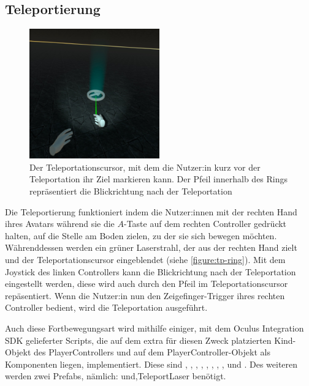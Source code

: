 \subsection{Teleportierung}\label{subsec:teleport-implementation}
\begin{figure}[!h]
    \centering
    \includegraphics[width=0.5\textwidth]{vrscreenshots/teleportring.jpg}
    \caption{Der Teleportationscursor, mit dem die Nutzer:in kurz vor der Teleportation ihr Ziel markieren kann. Der Pfeil innerhalb des Rings repräsentiert die Blickrichtung nach der Teleportation}\label{figure:tp-ring}
\end{figure}
    Die Teleportierung funktioniert indem die Nutzer:innen mit der rechten Hand ihres Avatars während sie die $A$-Taste auf dem rechten Controller gedrückt halten, auf die Stelle am Boden zielen, zu der sie sich bewegen möchten. Währenddessen werden ein grüner Laserstrahl, der aus der rechten Hand zielt und der Teleportationscursor eingeblendet (siehe \autoref{figure:tp-ring}). Mit dem Joystick des linken Controllers kann die Blickrichtung nach der Teleportation eingestellt werden, diese wird auch durch den Pfeil im Teleportationscursor repäsentiert. Wenn die Nutzer:in nun den Zeigefinger-Trigger ihres rechten Controller bedient, wird die Teleportation ausgeführt.

    Auch diese Fortbewegungsart wird mithilfe einiger, mit dem Oculus Integration SDK gelieferter Scripts, die auf dem extra für diesen Zweck platzierten Kind-Objekt des PlayerControllers  und auf dem PlayerController-Objekt als Komponenten liegen, implementiert. Diese sind , , , , , , , , und . Des weiteren werden zwei Prefabs, nämlich:  und\textquote,{TeleportLaser} benötigt.

